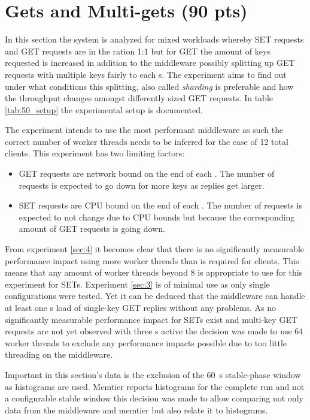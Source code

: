 \section{Gets and Multi-gets (90 pts)\label{sec:5}}

    In this section the system is analyzed for mixed workloads whereby SET requests and GET requests are in the ration
    1:1 but for GET the amount of keys requested is increased in addition to the middleware possibly splitting up GET
    requests with multiple keys fairly to each \srv{}s. The experiment aims to find out under what conditions this
    splitting, also called \emph{sharding} is preferable and how the throughput changes amongst differently sized GET
    requests. In table \ref{tab:50_setup} the experimental setup is documented.

    The experiment intends to use the most performant middleware as such the correct number of worker threads needs to
    be inferred for the case of 12 total clients. This experiment has two limiting factors:
    \begin{itemize}
        \item GET requests are network bound on the end of each \srv{}. The number of requests is expected to go down
              for more keys as replies get larger.
        \item SET requests are CPU bound on the end of each \cli{}. The number of requests is expected to not change
              due to CPU bounds but because the corresponding amount of GET requests is going down.
    \end{itemize}
    From experiment \ref{sec:4} it becomes clear that there is no significantly measurable performance impact using more
    worker threads than is required for clients. This means that any amount of worker threads beyond 8 is appropriate to
    use for this experiment for SETs. Experiment \ref{sec:3} is of minimal use as only single \srv{} configurations were
    tested. Yet it can be deduced that the middleware can handle at least one \srv{}s load of single-key GET replies
    without any problems. As no significantly measurable performance impact for SETs exist and multi-key GET requests
    are not yet observed with three \srv{}s active the decision was made to use 64 worker threads to exclude any
    performance impacts possible due to too little threading on the middleware.

    Important in this section's data is the exclusion of the \SI{60}{\second} stable-phase window as histograms are
    used. Memtier reports histograms for the complete run and not a configurable stable window this decision was made
    to allow comparing not only data from the middleware and memtier but also relate it to histograms.


